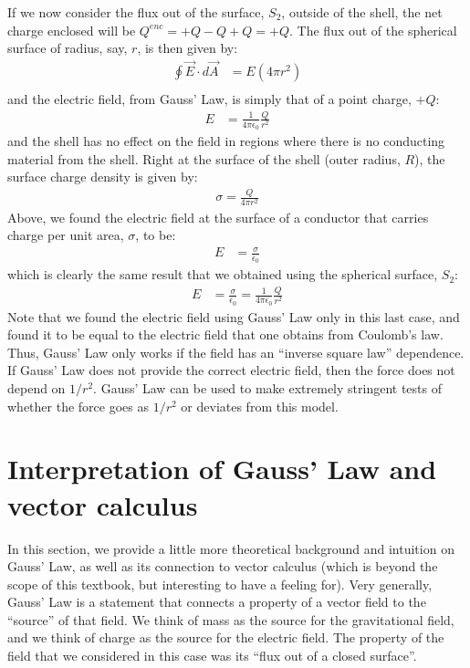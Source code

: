 If we now consider the flux out of the surface, $S_2$, outside of the shell, the net charge enclosed will be $Q^{enc}=+Q-Q+Q=+Q$. The flux out of the spherical surface of radius, say, $r$, is then given by:
\begin{align*}
\oint \vec E\cdot d\vec A &= E(4\pi r^2)\\
\end{align*}
and the electric field, from Gauss' Law, is simply that of a point charge, $+Q$:
\begin{align*}
E&=\frac{1}{4\pi\epsilon_0}\frac{Q}{r^2}
\end{align*}
and the shell has no effect on the field in regions where there is no conducting material from the shell. Right at the surface of the shell (outer radius, $R$), the surface charge density is given by:
\begin{align*}
\sigma=\frac{Q}{4\pi r^2}
\end{align*}
Above, we found the electric field at the surface of a conductor that carries charge per unit area, $\sigma$, to be:
\begin{align*}
E&= \frac{\sigma}{\epsilon_0}
\end{align*}
which is clearly the same result that we obtained using the spherical surface, $S_2$:
\begin{align*}
E&= \frac{\sigma}{\epsilon_0}=\frac{1}{4\pi\epsilon_0}\frac{Q}{r^2}
\end{align*}
Note that we found the electric field using Gauss' Law only in this last case, and found it to be equal to the electric field that one obtains from Coulomb's law. Thus, Gauss' Law only works if the field has an ``inverse square law'' dependence. If Gauss' Law does not provide the correct electric field, then the force does not depend on $1/r^2$. Gauss' Law can be used to make extremely stringent tests of whether the force goes as $1/r^2$ or deviates from this model.

\section{Interpretation of Gauss' Law and vector calculus}
\label{sec:gauss:interpretation}
In this section, we provide a little more theoretical background and intuition on Gauss' Law, as well as its connection to vector calculus (which is beyond the scope of this textbook, but interesting to have a feeling for). Very generally, Gauss' Law is a statement that connects a property of a vector field to the ``source'' of that field. We think of mass as the source for the gravitational field, and we think of charge as the source for the electric field. The property of the field that we considered in this case was its ``flux out of a closed surface''.

